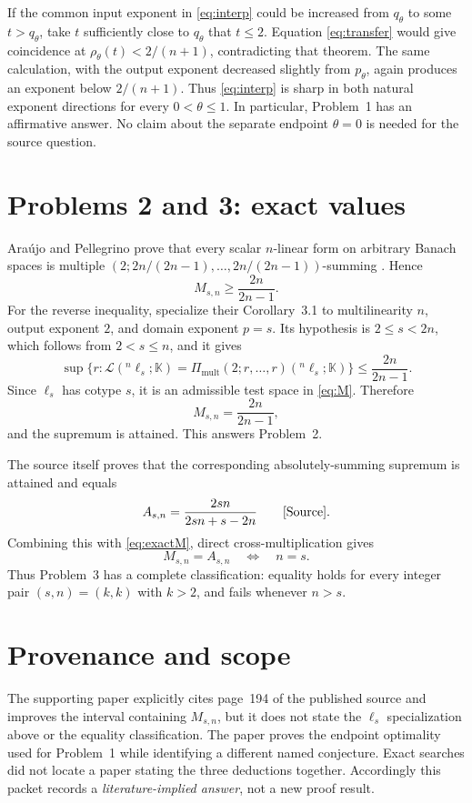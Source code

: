 \documentclass[11pt]{article}
\newcommand{\Lmult}{\Pi_{\mathrm{mult}}}
\begin{document}
If the common input exponent in \eqref{eq:interp} could be increased from
$q_\theta$ to some $t>q_\theta$, take $t$ sufficiently close to $q_\theta$
that $t\le2$.  Equation \eqref{eq:transfer} would give coincidence at
$\rho_\theta(t)<2/(n+1)$, contradicting that theorem.  The same calculation,
with the output exponent decreased slightly from $p_\theta$, again produces
an exponent below $2/(n+1)$.  Thus \eqref{eq:interp} is sharp in both natural
exponent directions for every $0<\theta\le1$.  In particular, Problem~1 has
an affirmative answer.  No claim about the separate endpoint $\theta=0$ is
needed for the source question.

\section{Problems 2 and 3: exact values}

Ara\'ujo and Pellegrino prove that every scalar $n$-linear form on arbitrary
Banach spaces is multiple
\((2;2n/(2n-1),\ldots,2n/(2n-1))\)-summing
\cite[Theorem~3.2(i)]{AP}.  Hence
\[
 M_{s,n}\ge \frac{2n}{2n-1}.
\]
For the reverse inequality, specialize their Corollary~3.1 to multilinearity
$n$, output exponent $2$, and domain exponent $p=s$.  Its hypothesis is
$2\le s<2n$, which follows from $2<s\le n$, and it gives
\[
 \sup\{r:\mathcal L({}^n\ell_s;\mathbb K)
 =\Lmult(2;r,\ldots,r)({}^n\ell_s;\mathbb K)\}
 \le \frac{2n}{2n-1}.
\]
Since $\ell_s$ has cotype $s$, it is an admissible test space in
\eqref{eq:M}.  Therefore
\begin{equation}\label{eq:exactM}
 \boxed{M_{s,n}=\frac{2n}{2n-1}},
\end{equation}
and the supremum is attained.  This answers Problem~2.

The source itself proves that the corresponding absolutely-summing supremum
is attained and equals
\[
 A_{s,n}=\frac{2sn}{2sn+s-2n}
 \qquad\text{\cite[Eq.~(2.10)]{Source}.}
\]
Combining this with \eqref{eq:exactM}, direct cross-multiplication gives
\[
 M_{s,n}=A_{s,n}
 \quad\Longleftrightarrow\quad n=s.
\]
Thus Problem~3 has a complete classification: equality holds for every
integer pair $(s,n)=(k,k)$ with $k>2$, and fails whenever $n>s$.

\section{Provenance and scope}

The supporting paper \cite{AP} explicitly cites page~194 of the published
source and improves the interval containing $M_{s,n}$, but it does not state
the $\ell_s$ specialization above or the equality classification.  The paper
\cite{PS} proves the endpoint optimality used for Problem~1 while identifying
a different named conjecture.  Exact searches did not locate a paper stating
the three deductions together.  Accordingly this packet records a
\emph{literature-implied answer}, not a new proof result.
\end{document}
